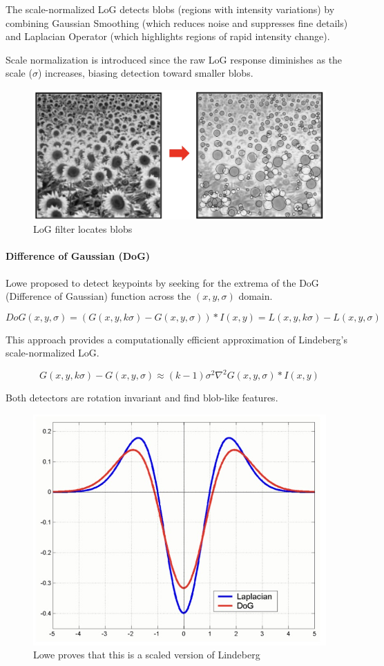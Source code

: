 \documentclass{article}
\begin{document}
The scale-normalized LoG detects blobs (regions with intensity variations) by combining Gaussian Smoothing (which reduces noise and suppresses fine details) and Laplacian Operator (which highlights regions of rapid intensity change).

Scale normalization is introduced since the raw LoG response diminishes as the scale ($\sigma$) increases, biasing detection toward smaller blobs.

\begin{figure}[htbp]
  \centering
  \includegraphics[width=0.7\linewidth]{./img/sunflower_blobs.jpg}
  \caption{LoG filter locates blobs}
  \label{fig:sunflower_blobs}
\end{figure}

\paragraph{Difference of Gaussian (DoG)}

Lowe proposed to detect keypoints by seeking for the extrema of the DoG (Difference of Gaussian) function across the $(x,y,\sigma)$ domain.

$$DoG(x,y,\sigma) = (G(x,y,k\sigma) - G(x,y,\sigma)) * I(x,y) = L(x,y,k\sigma) - L(x,y,\sigma)$$

This approach provides a computationally efficient approximation of Lindeberg's scale-normalized LoG.

$$G(x,y,k\sigma) - G(x,y,\sigma) \approx (k-1)\sigma^2\nabla^2 G(x,y,\sigma) * I(x,y)$$

Both detectors are rotation invariant and find blob-like features.

\begin{figure}[htbp]
  \centering
  \includegraphics[width=0.7\linewidth]{./img/dog.jpg}
  \caption{Lowe proves that this is a scaled version of Lindeberg}
  \label{fig:dog}
\end{figure}
\end{document}

